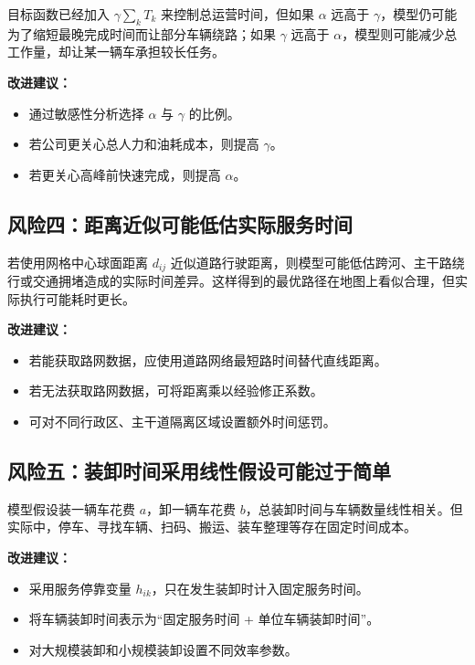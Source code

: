 \documentclass[UTF8,a4paper,12pt]{ctexart}
\begin{document}
目标函数已经加入 \(\gamma\sum_k T_k\) 来控制总运营时间，但如果 \(\alpha\) 远高于 \(\gamma\)，模型仍可能为了缩短最晚完成时间而让部分车辆绕路；如果 \(\gamma\) 远高于 \(\alpha\)，模型则可能减少总工作量，却让某一辆车承担较长任务。

\textbf{改进建议：}

\begin{itemize}
  \item 通过敏感性分析选择 \(\alpha\) 与 \(\gamma\) 的比例。
  \item 若公司更关心总人力和油耗成本，则提高 \(\gamma\)。
  \item 若更关心高峰前快速完成，则提高 \(\alpha\)。
\end{itemize}

\subsection{风险四：距离近似可能低估实际服务时间}

若使用网格中心球面距离 \(d_{ij}\) 近似道路行驶距离，则模型可能低估跨河、主干路绕行或交通拥堵造成的实际时间差异。这样得到的最优路径在地图上看似合理，但实际执行可能耗时更长。

\textbf{改进建议：}

\begin{itemize}
  \item 若能获取路网数据，应使用道路网络最短路时间替代直线距离。
  \item 若无法获取路网数据，可将距离乘以经验修正系数。
  \item 可对不同行政区、主干道隔离区域设置额外时间惩罚。
\end{itemize}

\subsection{风险五：装卸时间采用线性假设可能过于简单}

模型假设装一辆车花费 \(a\)，卸一辆车花费 \(b\)，总装卸时间与车辆数量线性相关。但实际中，停车、寻找车辆、扫码、搬运、装车整理等存在固定时间成本。

\textbf{改进建议：}

\begin{itemize}
  \item 采用服务停靠变量 \(h_{ik}\)，只在发生装卸时计入固定服务时间。
  \item 将车辆装卸时间表示为“固定服务时间 + 单位车辆装卸时间”。
  \item 对大规模装卸和小规模装卸设置不同效率参数。
\end{itemize}
\end{document}
